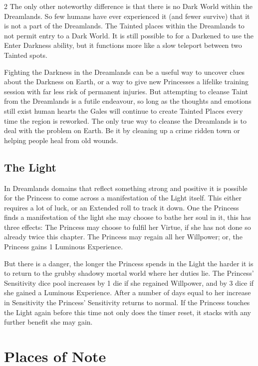 \begin{multicols}{2}
The only other noteworthy difference is that there is no Dark World within the Dreamlands. So few humans have ever experienced it (and fewer survive) that it is not a part of the Dreamlands. The Tainted places within the Dreamlands to not permit entry to a Dark World. It is still possible to for a Darkened to use the Enter Darkness ability, but it functions more like a slow teleport between two Tainted spots. 

Fighting the Darkness in the Dreamlands can be a useful way to uncover clues about the Darkness on Earth, or a way to give new Princesses a lifelike training session with far less risk of permanent injuries. But attempting to cleanse Taint from the Dreamlands is a futile endeavour, so long as the thoughts and emotions still exist human hearts the Gales will continue to create Tainted Places every time the region is reworked. The only true way to cleanse the Dreamlands is to deal with the problem on Earth. Be it by cleaning up a crime ridden town or helping people heal from old wounds.  

\subsection*{The Light}
In Dreamlands domains that reflect something strong and positive it is possible for the Princess to come across a manifestation of the Light itself. This either requires a lot of luck, or an Extended roll to track it down. One the Princess finds a manifestation of the light she may choose to bathe her soul in it, this has three effects: The Princess may choose to fulfil her Virtue, if she has not done so already twice this chapter. The Princess may regain all her Willpower; or, the Princess gains 1 Luminous Experience.

But there is a danger, the longer the Princess spends in the Light the harder it is to return to the grubby shadowy mortal world where her duties lie.  The Princess’ Sensitivity dice pool increases by 1 die if she regained Willpower, and by 3 dice if she gained a Luminous Experience. After a number of days equal to her increase in Sensitivity the Princess’ Sensitivity returns to normal. If the Princess touches the Light again before this time not only does the timer reset, it stacks with any further benefit she may gain.

\section*{Places of Note}


\end{multicols}
